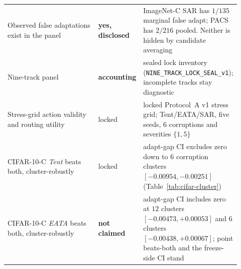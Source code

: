 \begin{center}
\begin{tabular}{@{}p{0.40\linewidth}p{0.14\linewidth}p{0.38\linewidth}@{}}
Observed false adaptations exist in the panel & \textbf{yes, disclosed} & ImageNet-C SAR has $1/135$ marginal false adapt; PACS has $2/216$ pooled. Neither is hidden by candidate averaging \\
Nine-track panel & \textbf{accounting} & sealed lock inventory (\texttt{NINE\_TRACK\_LOCK\_SEAL\_v1}); incomplete tracks stay diagnostic \\
Stress-grid action validity and routing utility & locked & locked Protocol~A v1 stress grid; Tent/EATA/SAR, five seeds, $6$ corruptions and severities $\{1,5\}$ \\
CIFAR-10-C \emph{Tent} beats both, cluster-robustly & locked & adapt-gap CI excludes zero down to $6$ corruption clusters $[-0.00954,-0.00251]$ (Table~\ref{tab:cifar-cluster}) \\
CIFAR-10-C \emph{EATA} beats both, cluster-robustly & \textbf{not claimed} & adapt-gap CI includes zero at $12$ clusters $[-0.00473,+0.00053]$ and $6$ clusters $[-0.00438,+0.00067]$; point beats-both and the freeze-side CI stand \\
\bottomrule
\end{tabular}
\end{center}

